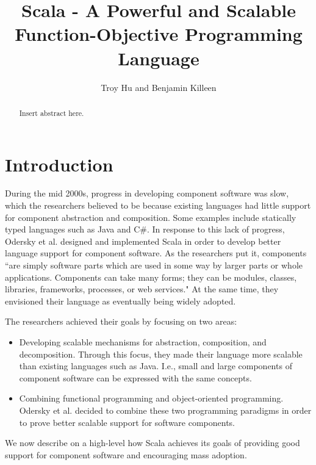 \documentclass[jou,apacite]{IEEEtran}
\title{Scala - A Powerful and Scalable Function-Objective Programming Language}
\author{Troy Hu and Benjamin Killeen} %
\begin{document}
\maketitle    
\begin{abstract}
Insert abstract here.
\end{abstract}                     

\section{Introduction}
\label{sec:intro}

During the mid 2000s, progress in developing component software was slow, which the researchers believed to be because existing languages had little support for component abstraction and composition. Some examples include statically typed languages such as Java and C\#. In response to this lack of progress, Odersky et al. designed and implemented Scala in order to develop better language support for component software. As the researchers put it, components ``are simply software parts which are used in some way by larger parts or whole applications. Components can take many forms; they can be modules, classes, libraries, frameworks, processes, or web services." At the same time, they envisioned their language as eventually being widely adopted. 


The researchers achieved their goals by focusing on two areas: 
\begin{itemize}
\item Developing scalable mechanisms for abstraction, composition, and
  decomposition. Through this focus, they made their language more scalable
  than existing languages such as Java. I.e., small and large components of
  component software can be expressed with the same concepts.
\item Combining functional programming and object-oriented
  programming. Odersky et al. decided to combine these two programming
  paradigms in order to prove better scalable support for software
  components.
\end{itemize}
We now describe on a high-level how Scala achieves its goals of providing
good support for component software and encouraging mass adoption.
\end{document}
